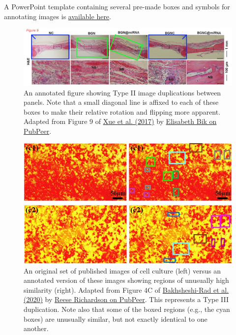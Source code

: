 \documentclass[letterpaper, 12pt]{article}
\begin{document}
A PowerPoint template containing several pre-made boxes and symbols for annotating images is \href{https://osf.io/w3epj}{available here}.
\begin{figure}[h!tbp]
    \centering
    \includegraphics[width=\textwidth]{img/image_duplication/xue_fig_9_small.png}
    \caption*{An annotated figure showing Type II image duplications between panels. Note that a small diagonal line is affixed to each of these boxes to make their relative rotation and flipping more apparent. Adapted from Figure 9 of \href{https://doi.org/10.1002/adhm.201700630}{Xue et al. (2017)} by \href{https://pubpeer.com/publications/C47278BACD8304A719E502DF7041A5\#1}{Elisabeth Bik on PubPeer}.}
\end{figure}

\begin{figure}[h!tbp]
    \centering
    \includegraphics[width=\textwidth]{img/image_duplication/Bakhsheshi-Rad_annotation.jpg}
    \caption*{An original set of published images of cell culture (left) versus an annotated version of these images showing regions of unusually high similarity (right). Adapted from Figure 4C of \href{https://doi.org/10.1016/j.polymertesting.2019.106298}{Bakhsheshi-Rad et al. (2020)} by \href{https://pubpeer.com/publications/60A225978670EFD93446CAC5696F7F\#1}{Reese Richardson on PubPeer}. This represents a Type III duplication. Note also that some of the boxed regions (e.g., the cyan boxes) are unusually similar, but not exactly identical to one another.}
\end{figure}
\end{document}
